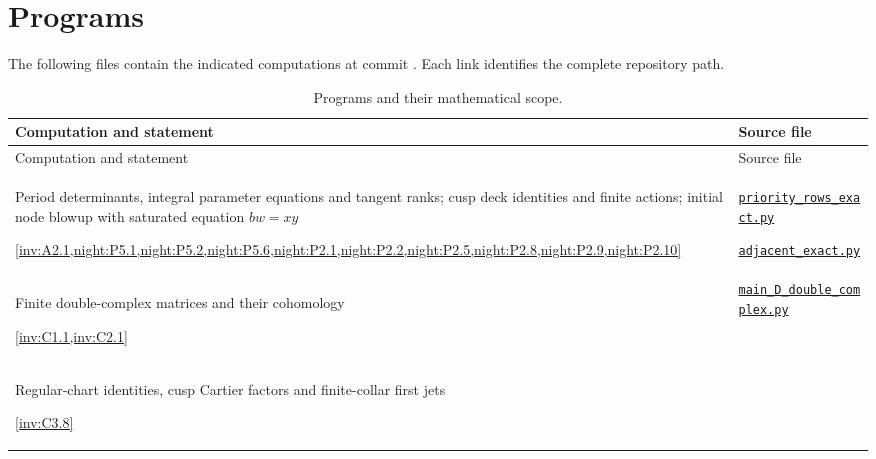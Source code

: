 \section*{Programs}
The following files contain the indicated computations at commit
\texttt{\SsixRepositoryCommit}. Each link identifies the complete repository path.

{\footnotesize
\setlength{\tabcolsep}{4pt}
\begin{longtable}{@{}>{\raggedright\arraybackslash}p{}>{\raggedright\arraybackslash}p{}@{}}
\caption{Programs and their mathematical scope.}\label{tab:I:programs}\\
\toprule
Computation and statement & Source file \\
\midrule
\endfirsthead
\toprule
Computation and statement & Source file \\
\midrule
\endhead
\bottomrule
\endfoot
\hypertarget{prog:I:integral-algebra}{}Period determinants, integral parameter equations and tangent ranks; cusp deck identities and finite actions; initial node blowup with saturated equation $bw=xy$\par \cref{inv:A2.1,night:P5.1,night:P5.2,night:P5.6,night:P2.1,night:P2.2,night:P2.5,night:P2.8,night:P2.9,night:P2.10} &
\href{https://raw.githubusercontent.com/KokunoYumeto/s6-complex-structure-workbench/\SsixRepositoryCommit/pro_returns/S6_SERIES_GRIND_checkpoint_10_20261120T0211Z/code/current_audits/audit_paper_i/code/priority_rows_exact.py}{\nolinkurl{priority_rows_exact.py}}\par \href{https://raw.githubusercontent.com/KokunoYumeto/s6-complex-structure-workbench/\SsixRepositoryCommit/pro_returns/S6_SERIES_GRIND_checkpoint_10_20261120T0211Z/code/current_audits/audit_paper_i/code/adjacent_exact.py}{\nolinkurl{adjacent_exact.py}} \\[3pt]
\hypertarget{prog:I:double-complex}{}Finite double-complex matrices and their cohomology\par \cref{inv:C1.1,inv:C2.1} &
\href{https://raw.githubusercontent.com/KokunoYumeto/s6-complex-structure-workbench/\SsixRepositoryCommit/pro_returns/S6_SERIES_GRIND_checkpoint_10_20261120T0211Z/code/current_audits/audit_paper_i/code/main_D_double_complex.py}{\nolinkurl{main_D_double_complex.py}} \\[3pt]
\hypertarget{prog:I:coefficient-atlas}{}Regular-chart identities, cusp Cartier factors and finite-collar first jets\par \cref{inv:C3.8} &

\end{longtable}}
